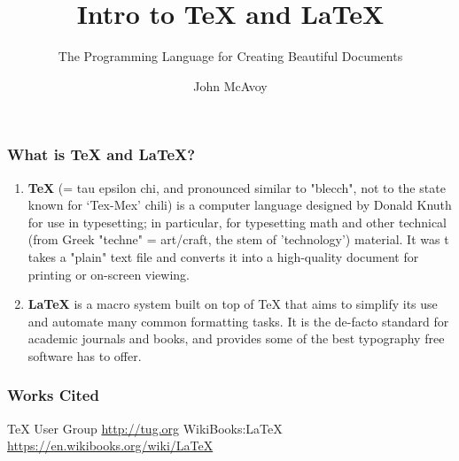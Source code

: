 \documentclass{beamer}
\title{Intro to {\TeX} and {\LaTeX}}
\subtitle{The Programming Language for Creating Beautiful Documents}
\author{John McAvoy}
\institute{A-Team Workshop}
\begin{document}
\frame{\titlepage}


\begin{frame}
  \frametitle{What is {\TeX} and {\LaTeX}?}

  \begin{enumerate}
    \item \textbf{\TeX} (= tau epsilon chi, and pronounced similar to "blecch",
      not to the state known for `Tex-Mex' chili) is a computer language
      designed by Donald Knuth for use in typesetting; in particular, for
      typesetting math and other technical (from Greek "techne" = art/craft, the
      stem of 'technology') material. It was t takes a "plain" text file and
      converts it into a high-quality document for printing or on-screen
      viewing.\cite{tug} \cite{wikibooks}

    \item \textbf{\LaTeX} is a macro system built on top of TeX that aims
      to simplify its use and automate many common formatting tasks. It is the
      de-facto standard for academic journals and books, and provides some of
      the best typography free software has to offer. \cite{wikibooks}

  \end{enumerate}
\end{frame}

\begin{frame}
  \frametitle{Works Cited}
  \begin{thebibliography}{1}
     {\TeX} User Group \url{http://tug.org}
     WikiBooks:{\LaTeX} \url{https://en.wikibooks.org/wiki/LaTeX}
  \end{thebibliography}
\end{frame}
\end{document}
